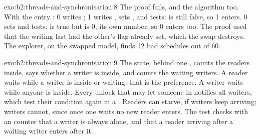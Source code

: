 \begin{solution}{exo:b2:threads-and-synchronisation:8}
The proof fails, and the algorithm too. With the entry :  0 writes ;  1 writes , sets , and tests:  is still false, so  1
enters.  0 sets  and tests:  is true but  is 0, its own number, so 
0 enters too. The proof used that the  writing  last had the other's flag already set, which the swap
destroys. The explorer, on the swapped model, finds 12 bad schedules out of 60.
\end{solution}

\begin{solution}{exo:b2:threads-and-synchronisation:9}
The state, behind one , counts the readers inside, says whether a writer is inside, and counts the waiting
writers. A reader waits while a writer is inside or waiting: that is the preference. A writer waits while anyone is
inside. Every unlock that may let someone in notifies all waiters, which test their condition again in a
. Readers can starve, if writers keep arriving; writers cannot, since once one waits no new reader enters.
The test checks with an  counter that a writer is always alone, and that a reader arriving after a waiting
writer enters after it.
\end{solution}

